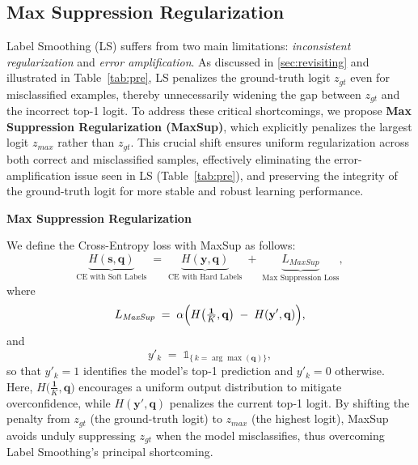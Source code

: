 \subsection{Max Suppression Regularization}  
\label{sec:maxsup}  
Label Smoothing (LS) suffers from two main limitations: \emph{inconsistent regularization} and \emph{error amplification}. As discussed in \cref{sec:revisiting} and illustrated in Table~\ref{tab:pre}, LS penalizes the ground-truth logit \(z_{gt}\) even for misclassified examples, thereby unnecessarily widening the gap between \(z_{gt}\) and the incorrect top-1 logit. To address these critical shortcomings, we propose \textbf{Max Suppression Regularization (MaxSup)}, which explicitly penalizes the largest logit \(z_{\textit{max}}\) rather than \(z_{gt}\). This crucial shift ensures uniform regularization across both correct and misclassified samples, effectively eliminating the error-amplification issue seen in LS (Table~\ref{tab:pre}), and preserving the integrity of the ground-truth logit for more stable and robust learning performance.

\begin{definition}\textbf{Max Suppression Regularization}

We define the Cross-Entropy loss with MaxSup as follows:
\begin{equation}
\underbrace{H(\mathbf{s}, \mathbf{q})}_{\text{CE with Soft Labels}}
\;=\;
\underbrace{H(\mathbf{y}, \mathbf{q})}_{\text{CE with Hard Labels}}
\;+\;
\underbrace{L_{\textit{MaxSup}}}_{\text{Max Suppression Loss}},
\end{equation}
where
\begin{equation}
\label{eq:label-MaxSup}
L_{\textit{MaxSup}}
\;=\;
\alpha \Bigl(
    H\bigl(\tfrac{\mathbf{1}}{K}, \mathbf{q}\bigr)
    \;-\;
    H(\mathbf{y}', \mathbf{q})
\Bigr),
\end{equation}
and
\[
y'_k
\;=\;
\mathds{1}_{\bigl\{\,k = \arg\max(\mathbf{q})\bigr\}},
\]
so that \(y'_k = 1\) identifies the model's top-1 prediction and \(y'_k = 0\) otherwise. Here, \(H\bigl(\tfrac{\mathbf{1}}{K}, \mathbf{q}\bigr)\) encourages a uniform output distribution to mitigate overconfidence, while \(H(\mathbf{y}', \mathbf{q})\) penalizes the current top-1 logit. By shifting the penalty from \(z_{gt}\) (the ground-truth logit) to \(z_{\textit{max}}\) (the highest logit), MaxSup avoids unduly suppressing \(z_{gt}\) when the model misclassifies, thus overcoming Label Smoothing’s principal shortcoming.
\end{definition}


